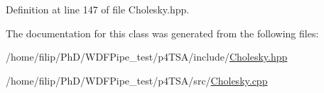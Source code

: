 Definition at line 147 of file Cholesky.\+hpp.



The documentation for this class was generated from the following files\+:\begin{DoxyCompactItemize}
\item 
/home/filip/\+Ph\+D/\+W\+D\+F\+Pipe\+\_\+test/p4\+T\+S\+A/include/\hyperlink{_cholesky_8hpp}{Cholesky.\+hpp}\item 
/home/filip/\+Ph\+D/\+W\+D\+F\+Pipe\+\_\+test/p4\+T\+S\+A/src/\hyperlink{_cholesky_8cpp}{Cholesky.\+cpp}\end{DoxyCompactItemize}
